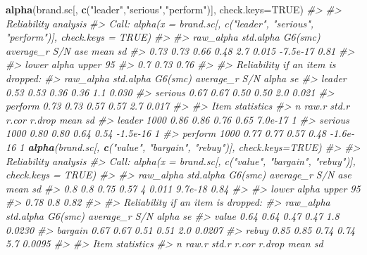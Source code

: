 \documentclass[12pt,]{book}
\makeatletter
\newenvironment{Shaded}{\begin{snugshade}}{\end{snugshade}}
\newcommand{\KeywordTok}[1]{\textcolor[rgb]{0.13,0.29,0.53}{\textbf{{#1}}}}
\newcommand{\DataTypeTok}[1]{\textcolor[rgb]{0.13,0.29,0.53}{{#1}}}
\newcommand{\StringTok}[1]{\textcolor[rgb]{0.31,0.60,0.02}{{#1}}}
\newcommand{\CommentTok}[1]{\textcolor[rgb]{0.56,0.35,0.01}{\textit{{#1}}}}
\newcommand{\OtherTok}[1]{\textcolor[rgb]{0.56,0.35,0.01}{{#1}}}
\newcommand{\NormalTok}[1]{{#1}}
\newenvironment{kframe}{%
\medskip{}
\setlength{\fboxsep}{.8em}
 \def\at@end@of@kframe{}%
 \ifinner\ifhmode%
  \def\at@end@of@kframe{\end{minipage}}%
  \begin{minipage}{\columnwidth}%
 \fi\fi%
 \def\FrameCommand##1{\hskip\@totalleftmargin \hskip-\fboxsep
 \colorbox{shadecolor}{##1}\hskip-\fboxsep
     \hskip-\linewidth \hskip-\@totalleftmargin \hskip\columnwidth}%
 \MakeFramed {\advance\hsize-\width
   \@totalleftmargin\z@ \linewidth\hsize
   \@setminipage}}%
 {\par\unskip\endMakeFramed%
 \at@end@of@kframe}
\renewenvironment{Shaded}{\begin{kframe}}{\end{kframe}}
\makeatother
\begin{document}
\begin{Shaded}
\begin{Highlighting}[]

\KeywordTok{alpha}\NormalTok{(brand.sc[, }\KeywordTok{c}\NormalTok{(}\StringTok{"leader"}\NormalTok{,}\StringTok{"serious"}\NormalTok{,}\StringTok{"perform"}\NormalTok{)], }\DataTypeTok{check.keys=}\OtherTok{TRUE}\NormalTok{)}
\CommentTok{#> }
\CommentTok{#> Reliability analysis   }
\CommentTok{#> Call: alpha(x = brand.sc[, c("leader", "serious", "perform")], check.keys = TRUE)}
\CommentTok{#> }
\CommentTok{#>   raw_alpha std.alpha G6(smc) average_r S/N   ase     mean   sd}
\CommentTok{#>       0.73      0.73    0.66      0.48 2.7 0.015 -7.5e-17 0.81}
\CommentTok{#> }
\CommentTok{#>  lower alpha upper     95%
\CommentTok{#> 0.7 0.73 0.76 }
\CommentTok{#> }
\CommentTok{#>  Reliability if an item is dropped:}
\CommentTok{#>         raw_alpha std.alpha G6(smc) average_r S/N alpha se}
\CommentTok{#> leader       0.53      0.53    0.36      0.36 1.1    0.030}
\CommentTok{#> serious      0.67      0.67    0.50      0.50 2.0    0.021}
\CommentTok{#> perform      0.73      0.73    0.57      0.57 2.7    0.017}
\CommentTok{#> }
\CommentTok{#>  Item statistics }
\CommentTok{#>            n raw.r std.r r.cor r.drop     mean sd}
\CommentTok{#> leader  1000  0.86  0.86  0.76   0.65  7.0e-17  1}
\CommentTok{#> serious 1000  0.80  0.80  0.64   0.54 -1.5e-16  1}
\CommentTok{#> perform 1000  0.77  0.77  0.57   0.48 -1.6e-16  1}
\KeywordTok{alpha}\NormalTok{(brand.sc[, }\KeywordTok{c}\NormalTok{(}\StringTok{"value"}\NormalTok{, }\StringTok{"bargain"}\NormalTok{, }\StringTok{"rebuy"}\NormalTok{)], }\DataTypeTok{check.keys=}\OtherTok{TRUE}\NormalTok{)}
\CommentTok{#> }
\CommentTok{#> Reliability analysis   }
\CommentTok{#> Call: alpha(x = brand.sc[, c("value", "bargain", "rebuy")], check.keys = TRUE)}
\CommentTok{#> }
\CommentTok{#>   raw_alpha std.alpha G6(smc) average_r S/N   ase    mean   sd}
\CommentTok{#>        0.8       0.8    0.75      0.57   4 0.011 9.7e-18 0.84}
\CommentTok{#> }
\CommentTok{#>  lower alpha upper     95%
\CommentTok{#> 0.78 0.8 0.82 }
\CommentTok{#> }
\CommentTok{#>  Reliability if an item is dropped:}
\CommentTok{#>         raw_alpha std.alpha G6(smc) average_r S/N alpha se}
\CommentTok{#> value        0.64      0.64    0.47      0.47 1.8   0.0230}
\CommentTok{#> bargain      0.67      0.67    0.51      0.51 2.0   0.0207}
\CommentTok{#> rebuy        0.85      0.85    0.74      0.74 5.7   0.0095}
\CommentTok{#> }
\CommentTok{#>  Item statistics }
\CommentTok{#>            n raw.r std.r r.cor r.drop     mean sd}
}}
\end{Highlighting}
\end{Shaded}
\end{document}
